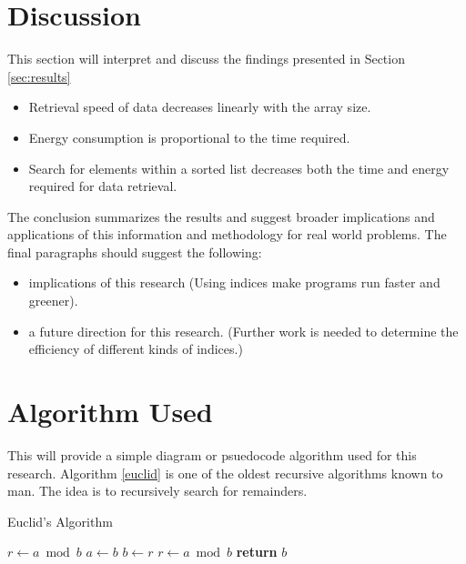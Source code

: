 \documentclass[journal,12pt]{IEEEtran}
\begin{document}
\section{Discussion}
This section will interpret and discuss the findings presented in Section \ref{sec:results}

\begin{itemize}
\item Retrieval speed of data decreases linearly with the array size.
\item Energy consumption is proportional to the time required.
\item Search for elements within a sorted list decreases both the time and energy required for data retrieval.
\end{itemize}

The conclusion summarizes the results and suggest broader implications and applications of this information and methodology for real world problems.
The final paragraphs should suggest the following:
 
 \begin{itemize}
 \item implications of this research (Using indices make programs run faster and greener).
 \item a future direction for this research. (Further work is needed to determine the efficiency of different kinds of indices.)
\end{itemize}

\appendices
\section{Algorithm Used}

This will provide a simple diagram or psuedocode algorithm used for this research. Algorithm \ref{euclid} is one of the oldest recursive algorithms known to man. The idea is to recursively search for remainders.

\begin{algorithm}[htb]
    \caption{Euclid's Algorithm}
    \label{euclid}
    \begin{algorithmic}[1] %
         
            \State $r\gets a \bmod b$
             
                \State $a \gets b$
                \State $b \gets r$
                \State $r \gets a \bmod b$
            \EndWhile\label{euclidendwhile}
            \State \textbf{return} $b$
        \EndProcedure
    \end{algorithmic}
\end{algorithm}
\end{document}
